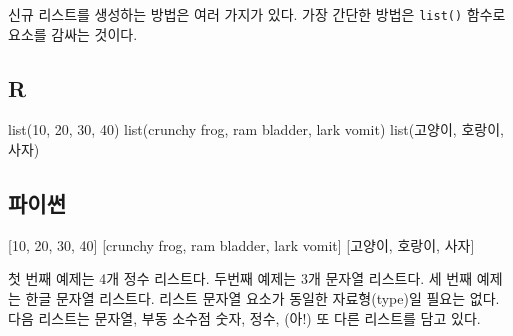 \documentclass[
  letterpaper,
]{book}
\newenvironment{Shaded}{\begin{snugshade}}{\end{snugshade}}
\newcommand{\DecValTok}[1]{\textcolor[rgb]{0.68,0.00,0.00}{#1}}
\newcommand{\FunctionTok}[1]{\textcolor[rgb]{0.28,0.35,0.67}{#1}}
\newcommand{\NormalTok}[1]{\textcolor[rgb]{0.00,0.23,0.31}{#1}}
\newcommand{\StringTok}[1]{\textcolor[rgb]{0.13,0.47,0.30}{#1}}
\begin{document}
신규 리스트를 생성하는 방법은 여러 가지가 있다. 가장 간단한 방법은
\texttt{list()} 함수로 요소를 감싸는 것이다.

\subsection*{R}\label{r-43}

\begin{Shaded}
\begin{Highlighting}[]
\FunctionTok{list}\NormalTok{(}\DecValTok{10}\NormalTok{, }\DecValTok{20}\NormalTok{, }\DecValTok{30}\NormalTok{, }\DecValTok{40}\NormalTok{)}
\FunctionTok{list}\NormalTok{(}\StringTok{\textquotesingle{}crunchy frog\textquotesingle{}}\NormalTok{, }\StringTok{\textquotesingle{}ram bladder\textquotesingle{}}\NormalTok{, }\StringTok{\textquotesingle{}lark vomit\textquotesingle{}}\NormalTok{)}
\FunctionTok{list}\NormalTok{(}\StringTok{\textquotesingle{}고양이\textquotesingle{}}\NormalTok{, }\StringTok{\textquotesingle{}호랑이\textquotesingle{}}\NormalTok{, }\StringTok{\textquotesingle{}사자\textquotesingle{}}\NormalTok{)}
\end{Highlighting}
\end{Shaded}

\subsection*{파이썬}\label{uxd30cuxc774uxc36c-43}

\begin{Shaded}
\begin{Highlighting}[]
\NormalTok{[}\DecValTok{10}\NormalTok{, }\DecValTok{20}\NormalTok{, }\DecValTok{30}\NormalTok{, }\DecValTok{40}\NormalTok{]}
\NormalTok{[}\StringTok{\textquotesingle{}crunchy frog\textquotesingle{}}\NormalTok{, }\StringTok{\textquotesingle{}ram bladder\textquotesingle{}}\NormalTok{, }\StringTok{\textquotesingle{}lark vomit\textquotesingle{}}\NormalTok{]}
\NormalTok{[}\StringTok{\textquotesingle{}고양이\textquotesingle{}}\NormalTok{, }\StringTok{\textquotesingle{}호랑이\textquotesingle{}}\NormalTok{, }\StringTok{\textquotesingle{}사자\textquotesingle{}}\NormalTok{]}
\end{Highlighting}
\end{Shaded}

첫 번째 예제는 4개 정수 리스트다. 두번째 예제는 3개 문자열 리스트다. 세
번째 예제는 한글 문자열 리스트다. 리스트 문자열 요소가 동일한
자료형(type)일 필요는 없다. 다음 리스트는 문자열, 부동 소수점 숫자,
정수, (아!) 또 다른 리스트를 담고 있다.
\end{document}

